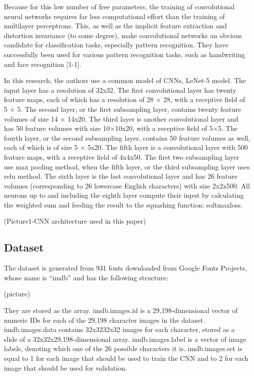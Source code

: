 \documentclass[10pt,twocolumn,letterpaper]{article}
\begin{document}
Because for this low number of free parameters, the training of convolutional neural networks requires far less computational effort than the training of multilayer perceptrons. This, as well as the implicit feature extraction and distortion invariance (to some degree), make convolutional networks an obvious candidate for classification tasks, especially pattern recognition. They have successfully been used for various pattern recognition tasks, such as handwriting and face recognition [1-1].

In this research, the authors use a common model of CNNs, LeNet-5 model. The input layer has a resolution of 32x32. The first convolutional layer has twenty feature maps, each of which has a resolution of 28 × 28, with a receptive field of 5 × 5. The second layer, or the first subsampling layer, contains twenty feature volumes of size 14 × 14x20. The third layer is another convolutional layer and has 50 feature volumes with size 10×10x20, with a receptive field of 5×5. The fourth layer, or the second subsampling layer, contains 50 feature volumes as well, each of which is of size 5 × 5x20. The fifth layer is a convolutional layer with 500 feature maps, with a receptive field of 4x4x50. The first two subsampling layer use max pooling method, when the fifth layer, or the third subsampling layer uses relu method. The sixth layer is the last convolutional layer and has 26 feature volumes (corresponding to 26 lowercase English characters) with size 2x2x500. All neurons up to and including the eighth layer compute their input by calculating the weighted sum and feeding the result to the squashing function: softmaxloss.

(Picture1-CNN architecture used in this paper)

\subsection*{Dataset}
The dataset is generated from 931 fonts downloaded from Google Fonts Projects, whose name is “imdb” and has the following structure:

(picture)

They are stored as the array. imdb.images.id is a 29,198-dimensional vector of numeric IDs for each of the 29,198 character images in the dataset. imdb.images.data contains  32x3232x32 images for each character, stored as a slide of a 32x32x29,198-dimensional array. imdb.images.label is a vector of image labels, denoting which one of the 26 possible characters it is. imdb.images.set is equal to 1 for each image that should be used to train the CNN and to 2 for each image that should be used for validation.
\end{document}
